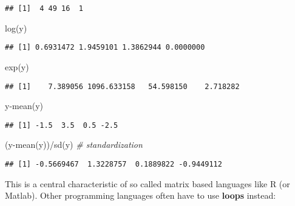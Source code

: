 \documentclass[
]{book}
\newenvironment{Shaded}{\begin{snugshade}}{\end{snugshade}}
\newcommand{\CommentTok}[1]{\textcolor[rgb]{0.56,0.35,0.01}{\textit{#1}}}
\newcommand{\FunctionTok}[1]{\textcolor[rgb]{0.00,0.00,0.00}{#1}}
\newcommand{\NormalTok}[1]{#1}
\newcommand{\SpecialCharTok}[1]{\textcolor[rgb]{0.00,0.00,0.00}{#1}}
\begin{document}
\begin{verbatim}
## [1]  4 49 16  1
\end{verbatim}

\begin{Shaded}
\begin{Highlighting}[]
\FunctionTok{log}\NormalTok{(y)}
\end{Highlighting}
\end{Shaded}

\begin{verbatim}
## [1] 0.6931472 1.9459101 1.3862944 0.0000000
\end{verbatim}

\begin{Shaded}
\begin{Highlighting}[]
\FunctionTok{exp}\NormalTok{(y)}
\end{Highlighting}
\end{Shaded}

\begin{verbatim}
## [1]    7.389056 1096.633158   54.598150    2.718282
\end{verbatim}

\begin{Shaded}
\begin{Highlighting}[]
\NormalTok{y}\SpecialCharTok{{-}}\FunctionTok{mean}\NormalTok{(y)}
\end{Highlighting}
\end{Shaded}

\begin{verbatim}
## [1] -1.5  3.5  0.5 -2.5
\end{verbatim}

\begin{Shaded}
\begin{Highlighting}[]
\NormalTok{(y}\SpecialCharTok{{-}}\FunctionTok{mean}\NormalTok{(y))}\SpecialCharTok{/}\FunctionTok{sd}\NormalTok{(y) }\CommentTok{\# standardization }
\end{Highlighting}
\end{Shaded}

\begin{verbatim}
## [1] -0.5669467  1.3228757  0.1889822 -0.9449112
\end{verbatim}

This is a central characteristic of so called matrix based languages like R (or Matlab). Other programming languages often have to use \textbf{loops} instead:
\end{document}
